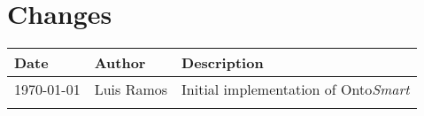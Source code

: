 \section{Changes}
\begin{tabular}{|m{3.0cm}|m{6.0cm}|m{6.0cm}|}
	\hline
	\textbf{Date} & \textbf{Author} & \textbf{Description}
	\tabularnewline
	\hline
	\today  & Luis Ramos &
	Initial implementation of Onto\textit{Smart}
	\tabularnewline
	\hline & &
	\tabularnewline
	\hline
\end{tabular}